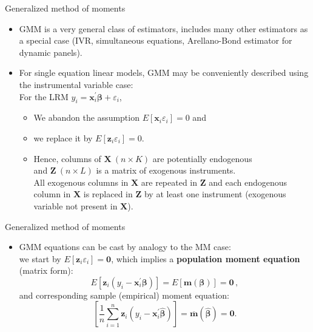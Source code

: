 \documentclass{beamer}
\begin{document}
\begin{frame}{Generalized method of moments}
\begin{itemize}
    \item GMM is a very general class of estimators, includes many other estimators as a special case (IVR, simultaneous equations, Arellano-Bond estimator for dynamic panels). 
    \medskip
    \item For single equation linear models, GMM may be conveniently described using the instrumental variable case:\\ \bigskip For the LRM $y_i = \bm{x}_i^{\prime}\bm{\beta} + \varepsilon_i$, 
    \begin{itemize}
    \medskip
        \item  We abandon the assumption $E[\bm{x}_i \varepsilon_i]=0$ and
        \medskip
        \item we replace it by $E[\bm{z}_i \varepsilon_i]=0$.  \\
        \medskip
        \item Hence, columns of $\bm{X}~(n\!\times\!K)$ are potentially endogenous \\ \medskip and $\bm{Z}~(n\!\times\!L)$ is a matrix of exogenous instruments.\\ \medskip All exogenous columns in $\bm{X}$ are repeated in $\bm{Z}$ and each endogenous column in $\bm{X}$ is replaced in $\bm{Z}$ by at least one instrument (exogenous variable not present in $\bm{X}$).
    \end{itemize}
\end{itemize}
\end{frame}
\begin{frame}{Generalized method of moments}
\begin{itemize}
\item GMM equations can be cast by analogy to the MM case: \\ \bigskip we start by $E[\bm{z}_i \varepsilon_i]=\bm{0}$, which implies a \textbf{population moment equation} (matrix form):
$$
E \left[ \bm{z}_i (y_i - \bm{x}_i^{\prime}\bm{\beta}) \right] 
= E \left[ \mathbf{m}(\bm{\beta}) \right] = \bm{0}\,,
$$
and corresponding sample (empirical) moment equation:
$$
\left[ \frac{1}{n} \sum_{i=1}^n \bm{z}_i (y_i - \bm{x}_i^{\prime}\hat{\bm{\beta}}) \right]
= \overline{\mathbf{m}}(\hat{\bm{\beta}}) = \bm{0}.
$$
\end{itemize}

\end{frame}
\end{document}
